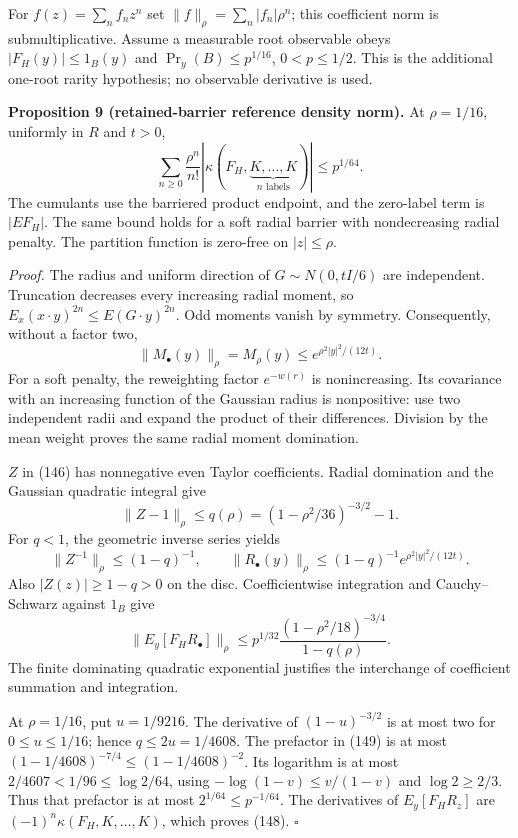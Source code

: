 \documentclass[11pt,a4paper]{article}
\begin{document}
For \(f(z)=\sum_n f_nz^n\) set \(\|f\|_\rho=\sum_n|f_n|\rho^n\); this
coefficient norm is submultiplicative. Assume a measurable root
observable obeys \(|F_H(y)|\le1_B(y)\) and \(\Pr_y(B)\le p^{1/16}\),
\(0<p\le1/2\). This is the additional one-root rarity hypothesis; no
observable derivative is used.

\textbf{Proposition 9 (retained-barrier reference density norm).} At
\(\rho=1/16\), uniformly in \(R\) and \(t>0\),
\[\sum_{n\ge0}\frac{\rho^n}{n!}
 |\kappa(F_H,\underbrace{K,\ldots,K}_{n\text{ labels}})|
\le p^{1/64}.\tag{148}\] The cumulants use the barriered product
endpoint, and the zero-label term is \(|EF_H|\). The same bound holds
for a soft radial barrier with nondecreasing radial penalty. The
partition function is zero-free on \(|z|\le\rho\).

\emph{Proof.} The radius and uniform direction of \(G\sim N(0,tI/6)\)
are independent. Truncation decreases every increasing radial moment, so
\(E_x(x\cdot y)^{2n}\le E(G\cdot y)^{2n}\). Odd moments vanish by
symmetry. Consequently, without a factor two,
\[\|M_\bullet(y)\|_\rho=M_\rho(y)
\le e^{\rho^2|y|^2/(12t)}.\] For a soft penalty, the reweighting factor
\(e^{-w(r)}\) is nonincreasing. Its covariance with an increasing
function of the Gaussian radius is nonpositive: use two independent
radii and expand the product of their differences. Division by the mean
weight proves the same radial moment domination.

\(Z\) in (146) has nonnegative even Taylor coefficients. Radial
domination and the Gaussian quadratic integral give
\[\|Z-1\|_\rho\le q(\rho)
=(1-\rho^2/36)^{-3/2}-1.\] For \(q<1\), the geometric inverse series
yields \[\|Z^{-1}\|_\rho\le(1-q)^{-1},\qquad
\|R_\bullet(y)\|_\rho
\le(1-q)^{-1}e^{\rho^2|y|^2/(12t)}.\] Also \(|Z(z)|\ge1-q>0\) on the
disc. Coefficientwise integration and Cauchy--Schwarz against \(1_B\)
give \[\|E_y[F_HR_\bullet]\|_\rho
\le p^{1/32}\frac{(1-\rho^2/18)^{-3/4}}{1-q(\rho)}.
\tag{149}\] The finite dominating quadratic exponential justifies the
interchange of coefficient summation and integration.

At \(\rho=1/16\), put \(u=1/9216\). The derivative of \((1-u)^{-3/2}\)
is at most two for \(0\le u\le1/16\); hence \(q\le2u=1/4608\). The
prefactor in (149) is at most \((1-1/4608)^{-7/4}\le(1-1/4608)^{-2}\).
Its logarithm is at most \(2/4607<1/96\le\log2/64\), using
\(-\log(1-v)\le v/(1-v)\) and \(\log2\ge2/3\). Thus that prefactor is at
most \(2^{1/64}\le p^{-1/64}\). The derivatives of \(E_y[F_HR_z]\) are
\((-1)^n\kappa(F_H,K,\ldots,K)\), which proves (148). \(\square\)
\end{document}
